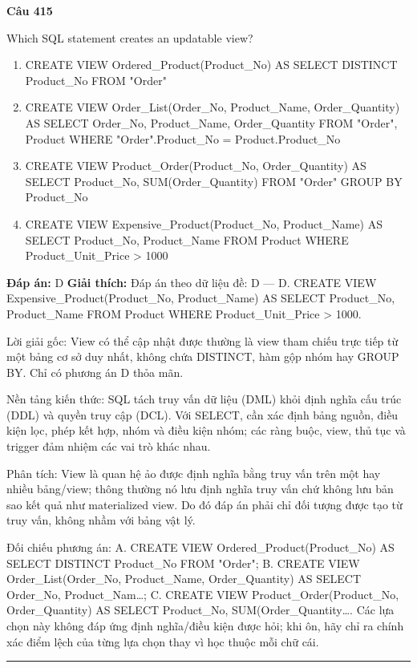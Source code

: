 \documentclass[11pt,a4paper]{article}
\newenvironment{question}[1]{%
  \par\vspace{1em}\noindent\textbf{\large Câu #1}\par\vspace{0.4em}
}{%
  \par\vspace{1em}\hrule\vspace{0.6em}
}
\newenvironment{choices}{%
  \begin{enumerate}[label=\textbf{\Alph*.},leftmargin=2.2em,itemsep=2pt,topsep=3pt]
}{%
  \end{enumerate}
}
\newcommand{\choice}{\item}
\begin{document}
\begin{question}{415}
Which SQL statement creates an updatable view?
\begin{choices}
\choice CREATE VIEW Ordered_Product(Product_No) AS SELECT DISTINCT Product_No FROM "Order"
\choice CREATE VIEW Order_List(Order_No, Product_Name, Order_Quantity) AS SELECT Order_No, Product_Name, Order_Quantity FROM "Order", Product WHERE "Order".Product_No = Product.Product_No
\choice CREATE VIEW Product_Order(Product_No, Order_Quantity) AS SELECT Product_No, SUM(Order_Quantity) FROM "Order" GROUP BY Product_No
\choice CREATE VIEW Expensive_Product(Product_No, Product_Name) AS SELECT Product_No, Product_Name FROM Product WHERE Product_Unit_Price > 1000
\end{choices}
\textbf{Đáp án:} D
\textbf{Giải thích:} Đáp án theo dữ liệu đề: D — D. CREATE VIEW Expensive_Product(Product_No, Product_Name) AS SELECT Product_No, Product_Name FROM Product WHERE Product_Unit_Price > 1000.

Lời giải gốc: View có thể cập nhật được thường là view tham chiếu trực tiếp từ một bảng cơ sở duy nhất, không chứa DISTINCT, hàm gộp nhóm hay GROUP BY. Chỉ có phương án D thỏa mãn.

Nền tảng kiến thức: SQL tách truy vấn dữ liệu (DML) khỏi định nghĩa cấu trúc (DDL) và quyền truy cập (DCL). Với SELECT, cần xác định bảng nguồn, điều kiện lọc, phép kết hợp, nhóm và điều kiện nhóm; các ràng buộc, view, thủ tục và trigger đảm nhiệm các vai trò khác nhau.

Phân tích: View là quan hệ ảo được định nghĩa bằng truy vấn trên một hay nhiều bảng/view; thông thường nó lưu định nghĩa truy vấn chứ không lưu bản sao kết quả như materialized view. Do đó đáp án phải chỉ đối tượng được tạo từ truy vấn, không nhầm với bảng vật lý.

Đối chiếu phương án: A. CREATE VIEW Ordered_Product(Product_No) AS SELECT DISTINCT Product_No FROM "Order"; B. CREATE VIEW Order_List(Order_No, Product_Name, Order_Quantity) AS SELECT Order_No, Product_Nam…; C. CREATE VIEW Product_Order(Product_No, Order_Quantity) AS SELECT Product_No, SUM(Order_Quantity…. Các lựa chọn này không đáp ứng định nghĩa/điều kiện được hỏi; khi ôn, hãy chỉ ra chính xác điểm lệch của từng lựa chọn thay vì học thuộc mỗi chữ cái.
\end{question}
\end{document}
